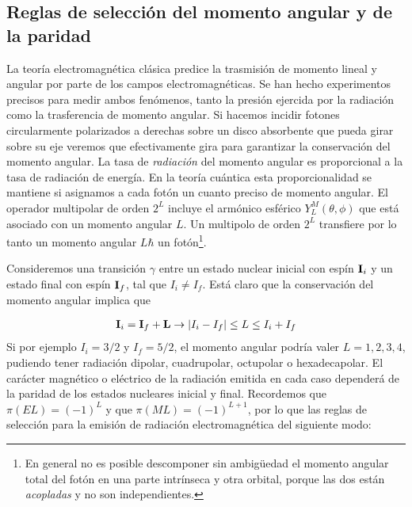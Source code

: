 \subsection{Reglas de selección del momento angular y de la paridad}

La teoría electromagnética clásica predice la trasmisión de momento lineal y angular por parte de los campos electromagnéticas. Se han hecho experimentos precisos para medir ambos fenómenos, tanto la presión ejercida por la radiación como la trasferencia de momento angular. Si hacemos incidir fotones circularmente polarizados a derechas sobre un disco absorbente que pueda girar sobre su eje veremos que efectivamente gira para garantizar la conservación del momento angular. La tasa de \textit{radiación} del momento angular es proporcional a la tasa de radiación de energía. En la teoría cuántica esta proporcionalidad se mantiene si asignamos a cada fotón un cuanto preciso de momento angular. El operador multipolar de orden $2^L$ incluye el armónico esférico $Y_L^M (\theta,\phi)$ que está asociado con un momento angular $L$. Un multipolo de orden $2^L$ transfiere por lo tanto un momento angular $L\hbar$ un fotón\footnote{En general no es posible descomponer sin ambigüedad el momento angular total del fotón en una parte intrínseca y otra orbital, porque las dos están \textit{acopladas} y no son independientes.}.

Consideremos una transición $\gamma$ entre un estado nuclear inicial con espín $\mathbf{I}_i$ y un estado final con espín $\mathbf{I}_f$, tal que $I_i\neq I_f$. Está claro que la conservación del momento angular implica que

\begin{eqnarray}
	\mathbf{I}_i = \mathbf{I}_f + \mathbf{L}  \rightarrow |I_i -I_f|\leq L\leq I_i + I_f
\end{eqnarray}
Si por ejemplo $I_i=3/2$ y $I_f=5/2$, el momento angular podría valer $L=1,2,3,4$, pudiendo tener radiación dipolar, cuadrupolar, octupolar o hexadecapolar. El carácter magnético o eléctrico de la radiación emitida en cada caso dependerá de la paridad de los estados nucleares inicial y final. Recordemos que $\pi(EL)=(-1)^L$ y que $\pi(ML)=(-1)^{L+1}$, por lo que las reglas de selección para la emisión de radiación electromagnética del siguiente modo:

